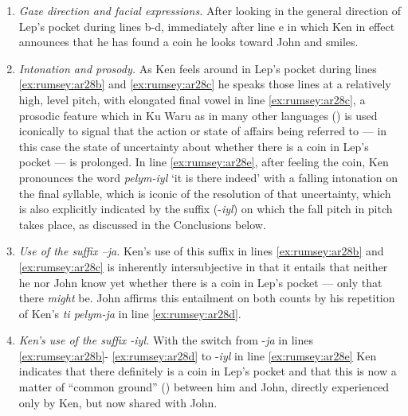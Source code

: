 \documentclass[output=paper]{langsci/langscibook}
\begin{document}
\begin{enumerate}
	\item \emph{Gaze direction and facial expressions.} After looking in the general direction of Lep’s pocket during lines b-d, immediately after line e in which Ken in effect announces that he has found a coin he looks toward John and smiles. 
	\item \emph{Intonation and prosody.} As Ken feels around in Lep’s pocket during lines \ref{ex:rumsey:ar28b} and \ref{ex:rumsey:ar28c} he speaks those lines at a relatively high, level pitch, with elongated final vowel in line  \ref{ex:rumsey:ar28c}, a prosodic feature which in Ku Waru as in many other languages (\citealt{Tedlock1983}) is used iconically to signal that the action or state of affairs being referred to — in this case the state of uncertainty about whether there is a coin in Lep’s pocket — is prolonged. In line  \ref{ex:rumsey:ar28e}, after feeling the coin, Ken pronounces the word \textit{pelym-iyl} ‘it is there indeed’ with a falling intonation on the final syllable, which is iconic of the resolution of that uncertainty, which is also explicitly indicated by the suffix (-\textit{iyl}) on which the fall pitch in pitch takes place, as discussed in the Conclusions below.  
	\item \emph{Use of the suffix –\textit{ja}.} Ken’s use of this suffix in lines  \ref{ex:rumsey:ar28b} and  \ref{ex:rumsey:ar28c} is inherently intersubjective in that it entails that neither he nor John know yet whether there is a coin in Lep’s pocket — only that there \emph{might} be. John affirms this entailment on both counts by his repetition of Ken’s \textit{ti pelym-ja} in line  \ref{ex:rumsey:ar28d}.
	\item \emph{Ken’s use of the suffix -\textit{iyl}.}  With the switch from -\textit{ja} in lines  \ref{ex:rumsey:ar28b}- \ref{ex:rumsey:ar28d} to -\textit{iyl} in line  \ref{ex:rumsey:ar28e} Ken indicates that there definitely is a coin in Lep’s pocket and that this is now a matter of  “common ground” (\citealt{Clark1996}) between him and John, directly experienced only by Ken, but now shared with John.

\end{enumerate}
\end{document}
